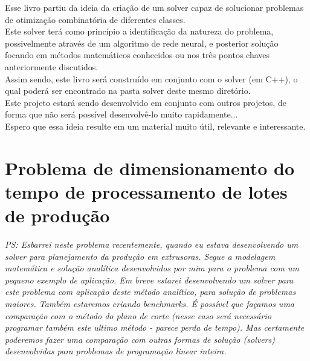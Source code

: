 \documentclass{book}
\begin{document}
Esse livro partiu da ideia da criação de um solver capaz de solucionar problemas de otimização combinatória de diferentes classes. \\

Este solver terá como princípio a identificação da natureza do problema, possivelmente através de um algoritmo de rede neural, e posterior solução focando em métodos matemáticos conhecidos ou nos três pontos chaves anteriormente discutidos. \\

Assim sendo, este livro será construído em conjunto com o solver (em C++), o qual poderá ser encontrado na pasta solver deste mesmo diretório. \\

Este projeto estará sendo desenvolvido em conjunto com outros projetos, de forma que não será possível desenvolvê-lo muito rapidamente... \\

Espero que essa ideia resulte em um material muito útil, relevante e interessante.

\section{Problema de dimensionamento do tempo de processamento de lotes de produção}

\emph{PS: Esbarrei neste problema recentemente, quando eu estava desenvolvendo um solver para planejamento da produção em extrusoras. Segue a modelagem matemática e solução analítica desenvolvidos por mim para o problema com um pequeno exemplo de aplicação. Em breve estarei desenvolvendo um solver para este problema com aplicação deste método analítico, para solução de problemas maiores. Também estaremos criando benchmarks. É possível que façamos uma comparação com o método do plano de corte (nesse caso será necessário programar também este ultimo método - parece perda de tempo). Mas certamente poderemos fazer uma comparação com outras formas de solução (solvers) desenvolvidas para problemas de programação linear inteira.} \\
\end{document}
